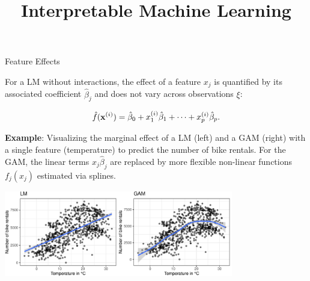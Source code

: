\documentclass[11pt,compress,t,notes=noshow, xcolor=table]{beamer}
\title{Interpretable Machine Learning}
\institute{\href{https://compstat-lmu.github.io/lecture_iml/}{compstat-lmu.github.io/lecture\_iml}}
\date{}
\begin{document}






\begin{vbframe}{Feature Effects}

For a LM without interactions, the effect of a feature $x_j$ is quantified by its associated coefficient $\hat\beta_j$ and does not vary across observations $\xi$:

$$\fh(\xi) = \hat\beta_0 + x^{(i)}_1\hat\beta_1 + \dots + x^{(i)}_p\hat\beta_p.$$




\lz
\textbf{Example}: Visualizing the marginal effect of a LM (left) and a GAM (right) with a single feature (temperature) to predict the number of bike rentals. For the GAM, the linear terms $x_j\hat\beta_j$ are replaced by more flexible non-linear functions $f_j(x_j)$ estimated via splines.

\centering
\includegraphics[width=0.75\textwidth, trim=0cm 0.1cm 0cm 0cm, clip]{figure_man/lm_main_effects}

\end{vbframe}
\end{document}
